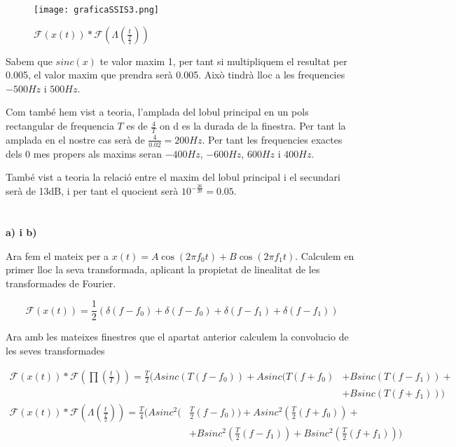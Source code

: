 \documentclass[12pt, a4papre]{article}
\begin{document}
	\begin{figure}[H]
		\begin{center}
		\texttt{[image: graficaSSIS3.png]}
		\end{center}
		\caption{$\mathcal{F}(x(t))*\mathcal{F}(\Lambda(\frac{t}{\frac{T}{2}}))$}
	\end{figure}
	
	Sabem que $sinc(x)$ te valor maxim 1, per tant si multipliquem el resultat per 0.005, el valor maxim que prendra serà 0.005. Això tindrà lloc a les frequencies $-500Hz$ i $500Hz$.
	
	 Com també hem vist a teoria, l'amplada del lobul principal en un pols rectangular de frequencia $T$ es de $\frac{4}{T}$ on d es la durada de la finestra. Per tant la amplada en el nostre cas serà de $\frac{4}{0.02} = 200Hz$. Per tant les frequencies exactes dels 0 mes propers als maxims seran $-400Hz$, $-600Hz$, $600Hz$ i $400Hz$.
	
	També vist a teoria la relació entre el maxim del lobul principal i el secundari serà de 13dB, i per tant el quocient serà $10^{-\frac{26}{20}} = 0.05$.
	
	\newpage
	\section{}
	
	\textbf{a) i b)}
	
	Ara fem el mateix per a $x(t) = A\cos(2\pi f_0t) + B\cos(2\pi f_1t)$. Calculem en primer lloc la seva transformada, aplicant la propietat de linealitat de les transformades de Fourier.
	
	\[\mathcal{F}(x(t)) = \frac{1}{2}(\delta(f - f_0) + \delta(f - f_0) + \delta(f - f_1) + \delta(f - f_1)) \]
	
	Ara amb les mateixes finestres que el apartat anterior calculem la convolucio de les seves transformades
	
	
	\[
	\begin{aligned}
	\mathcal{F}(x(t))*\mathcal{F}(\prod(\frac{t}{T})) =   \frac{T}{2}(Asinc(T(f - f_0)) + Asinc(T(f + f_0)& + Bsinc(T(f - f_1)) + \\
      &+ Bsinc(T(f + f_1)))
	\end{aligned}
	\]	
	\[
	\begin{aligned}
	\mathcal{F}(x(t))*\mathcal{F}(\Lambda(\frac{t}{\frac{T}{2}})) =   \frac{T}{4}(Asinc^2(&\frac{T}{2}(f - f_0)) + Asinc^2(\frac{T}{2}(f + f_0)) +  \\
      &  + Bsinc^2(\frac{T}{2}(f - f_1)) + Bsinc^2(\frac{T}{2}(f + f_1)))
	\end{aligned}
	\]
	
\end{document}

